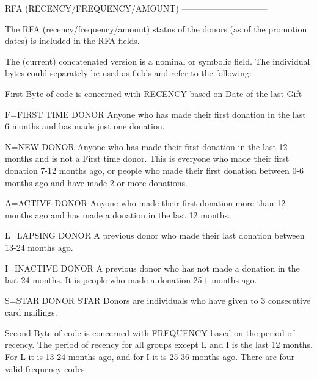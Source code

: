 \documentclass[
  11pt,
  a4paper,
  DIV=12,captions=tableheading,oneside,titlepage]{scrbook}
\let\oldverbatim\verbatim
\let\endoldverbatim\endverbatim
\renewenvironment{verbatim}{\footnotesize\oldverbatim}{\endoldverbatim}
\begin{document}
\begin{verbatim}
                            RFA (RECENCY/FREQUENCY/AMOUNT)
                            ------------------------------
 
                            The RFA (recency/frequency/amount) status of the 
                            donors (as of the promotion dates) is included in the 
                            RFA fields.
 
                            The (current) concatenated version is a nominal 
                            or symbolic field. The individual bytes could 
                            separately be used as fields and refer to the 
                            following: 

                            First Byte of code is concerned with RECENCY
                            based on Date of the last Gift

                            F=FIRST TIME DONOR Anyone who has made their
                              first donation in the last 6 months and has
                              made just one donation.

                            N=NEW DONOR Anyone who has made their first
                              donation in the last 12 months and is not a
                              First time donor.  This is everyone who made
                              their first donation 7-12 months ago, or
                              people who made their first donation between
                              0-6 months ago and have made 2 or more
                              donations.

                            A=ACTIVE DONOR Anyone who made their first
                              donation more than 12 months ago and has made
                              a donation in the last 12 months.

                            L=LAPSING DONOR A previous donor who made their
                              last donation between 13-24 months ago.

                            I=INACTIVE DONOR A previous donor who has not
                              made a donation in the last 24 months.  It is
                              people who made a donation 25+ months ago.

                            S=STAR DONOR STAR Donors are individuals who
                              have given to 3 consecutive card mailings.


                            Second Byte of code is concerned with FREQUENCY
                            based on the period of recency.  The period of
                            recency for all groups except L and I is the
                            last 12 months.  For L it is 13-24 months ago,
                            and for I it is 25-36 months ago.  There are
                            four valid frequency codes.


\end{verbatim}
\end{document}
